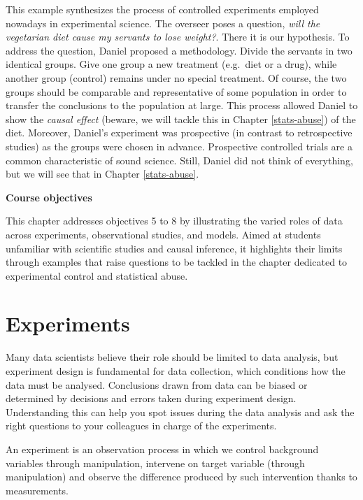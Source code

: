 \documentclass[
  12pt,
]{book}
\begin{document}
This example synthesizes the process of controlled experiments employed nowadays in experimental science. The overseer poses a question, \emph{will the vegetarian diet cause my servants to lose weight?}. There it is our hypothesis. To address the question, Daniel proposed a methodology. Divide the servants in two identical groups. Give one group a new treatment (e.g.~diet or a drug), while another group (control) remains under no special treatment. Of course, the two groups should be comparable and representative of some population in order to transfer the conclusions to the population at large. This process allowed Daniel to show the \emph{causal effect} (beware, we will tackle this in Chapter \ref{stats-abuse}) of the diet. Moreover, Daniel's experiment was prospective (in contrast to retrospective studies) as the groups were chosen in advance. Prospective controlled trials are a common characteristic of sound science. Still, Daniel did not think of everything, but we will see that in Chapter \ref{stats-abuse}.

\begin{simplebox}

\textbf{Course objectives}

This chapter addresses objectives 5 to 8 by illustrating the varied roles of data across experiments, observational studies, and models. Aimed at students unfamiliar with scientific studies and causal inference, it highlights their limits through examples that raise questions to be tackled in the chapter dedicated to experimental control and statistical abuse.

\end{simplebox}

\section{Experiments}\label{experiments}

Many data scientists believe their role should be limited to data analysis, but experiment design is fundamental for data collection, which conditions how the data must be analysed. Conclusions drawn from data can be biased or determined by decisions and errors taken during experiment design. Understanding this can help you spot issues during the data analysis and ask the right questions to your colleagues in charge of the experiments.

An experiment is an observation process in which we control background variables through manipulation, intervene on target variable (through manipulation) and observe the difference produced by such intervention thanks to measurements.
\end{document}
